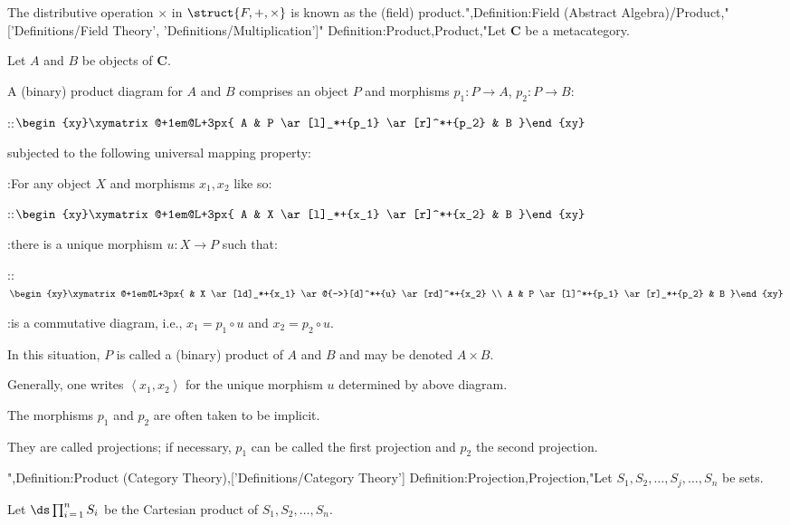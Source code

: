 The distributive operation $\times$ in $\struct {F, +, \times}$ is known as the (field) product.",Definition:Field (Abstract Algebra)/Product,"['Definitions/Field Theory', 'Definitions/Multiplication']"
Definition:Product,Product,"Let $\mathbf C$ be a metacategory.

Let $A$ and $B$ be objects of $\mathbf C$.


A (binary) product diagram for $A$ and $B$ comprises an object $P$ and morphisms $p_1: P \to A$, $p_2: P \to B$:

::$\begin{xy}\xymatrix@+1em@L+3px{
 A
&
 P
  \ar[l]_*+{p_1}
  \ar[r]^*+{p_2}
&
 B
}\end{xy}$

subjected to the following universal mapping property:


:For any object $X$ and morphisms $x_1, x_2$ like so:

::$\begin{xy}\xymatrix@+1em@L+3px{
 A
&
 X
  \ar[l]_*+{x_1}
  \ar[r]^*+{x_2}
&
 B
}\end{xy}$

:there is a unique morphism $u: X \to P$ such that:

::$\begin{xy}\xymatrix@+1em@L+3px{
&
 X
  \ar[ld]_*+{x_1}
  \ar@{-->}[d]^*+{u}
  \ar[rd]^*+{x_2}

\\
 A
&
 P
  \ar[l]^*+{p_1}
  \ar[r]_*+{p_2}
&
 B
}\end{xy}$

:is a commutative diagram, i.e., $x_1 = p_1 \circ u$ and $x_2 = p_2 \circ u$.


In this situation, $P$ is called a (binary) product of $A$ and $B$ and may be denoted $A \times B$.

Generally, one writes $\left\langle{x_1, x_2}\right\rangle$ for the unique morphism $u$ determined by above diagram.


The morphisms $p_1$ and $p_2$ are often taken to be implicit.

They are called projections; if necessary, $p_1$ can be called the first projection and $p_2$ the second projection.

",Definition:Product (Category Theory),['Definitions/Category Theory']
Definition:Projection,Projection,"Let $S_1, S_2, \ldots, S_j, \ldots, S_n$ be sets.

Let $\ds \prod_{i \mathop = 1}^n S_i$ be the Cartesian product of $S_1, S_2, \ldots, S_n$.


